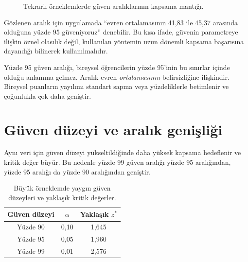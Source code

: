 \begin{figure}[htbp]
\centering
{}
\caption{Tekrarlı örneklemlerde güven aralıklarının kapsama mantığı.}
\end{figure}

Gözlenen aralık için uygulamada ``evren ortalamasının 41,83 ile 45,37
arasında olduğuna yüzde 95 güveniyoruz'' denebilir. Bu kısa ifade, güvenin
parametreye ilişkin öznel olasılık değil, kullanılan yöntemin uzun dönemli
kapsama başarısına dayandığı bilinerek kullanılmalıdır.

\begin{mistakebox}
Yüzde 95 güven aralığı, bireysel öğrencilerin yüzde 95'inin bu sınırlar içinde
olduğu anlamına gelmez. Aralık evren \emph{ortalamasının} belirsizliğine
ilişkindir. Bireysel puanların yayılımı standart sapma veya yüzdeliklerle
betimlenir ve çoğunlukla çok daha geniştir.
\end{mistakebox}

\section{Güven düzeyi ve aralık genişliği}

Aynı veri için güven düzeyi yükseltildiğinde daha yüksek kapsama hedeflenir ve
kritik değer büyür. Bu nedenle yüzde 99 güven aralığı yüzde 95 aralığından,
yüzde 95 aralığı da yüzde 90 aralığından geniştir.

\begin{table}[htbp]
\centering
\caption{Büyük örneklemde yaygın güven düzeyleri ve yaklaşık kritik değerler.}
\begin{tabular}{@{}ccc@{}}
\toprule
Güven düzeyi & $\alpha$ & Yaklaşık $z^*$ \\
\midrule
Yüzde 90 & 0,10 & 1,645 \\
Yüzde 95 & 0,05 & 1,960 \\
Yüzde 99 & 0,01 & 2,576 \\
\bottomrule
\end{tabular}
\end{table}

